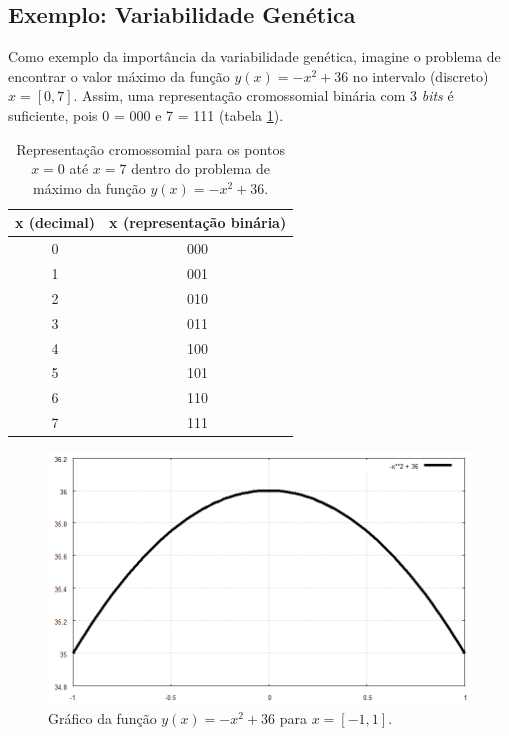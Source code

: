 	\subsection{\label{ExemploVariabilidade}Exemplo: Variabilidade Genética}
	
	Como exemplo da importância da variabilidade genética, imagine o problema de encontrar o valor máximo da função $y(x) = -x^2 + 36$ no intervalo (discreto) $x = [0,7]$. Assim, uma representação cromossomial binária com 3 \textit{bits} é suficiente, pois 0 = 000 e 7 = 111 (tabela \ref{tabRepCroX2}).
	
	\begin{table}[htp]
 		\caption{\label{tabRepCroX2}Representação cromossomial para os pontos $x = 0$ até $x = 7$ dentro do problema de máximo da função $y(x) = -x^2 + 36$.}
 		\begin{center}
  		\begin{tabular}{c|c}
   			\hline
   			\textbf{x (decimal)}  & \textbf{x (representação binária)} \\
   			\hline
   			0 & 000 \\
   			1 & 001 \\
   			2 & 010 \\ 
   			3 & 011 \\
   			4 & 100 \\
   			5 & 101 \\ 
   			6 & 110 \\
   			7 & 111	\\
   			\hline
   		\end{tabular}
 		\end{center}
	\end{table}
	
	\begin{figure}[htp]
		\begin{center}
			\includegraphics[width=13cm]{figs/ga/Parabola.png}
		\end{center}
		\caption{\label{figParabola}Gráfico da função $y(x) = -x^2 + 36$ para $x = [-1,1]$.}
	\end{figure}
	
